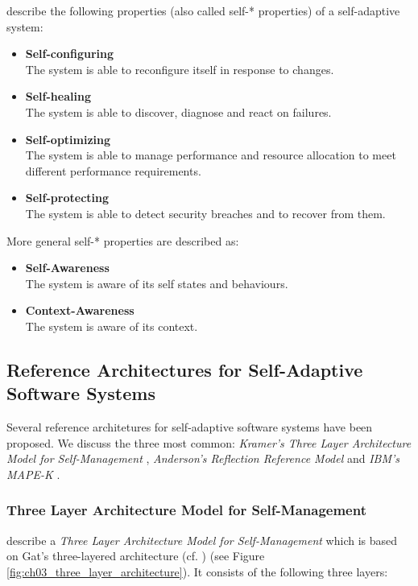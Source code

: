 \cite{Salehie:2009pi} describe the following properties (also called self-* properties) of a self-adaptive system:
\begin{itemize}
	\item \textbf{Self-configuring}\\
	The system is able to reconfigure itself in response to changes.
	\item \textbf{Self-healing}\\
	The system is able to discover, diagnose and react on failures.
	\item \textbf{Self-optimizing}\\
	The system is able to manage performance and resource allocation to meet different performance requirements.
	\item \textbf{Self-protecting}\\
	The system is able to detect security breaches and to recover from them.
\end{itemize}

More general self-* properties are described as:
\begin{itemize}
	\item \textbf{Self-Awareness}\\
	The system is aware of its self states and behaviours.
	\item \textbf{Context-Awareness}\\
	The system is aware of its context.
\end{itemize}

\subsection{Reference Architectures for Self-Adaptive Software Systems}
Several reference architetures for self-adaptive software systems have been proposed. We discuss the three most common: \emph{Kramer's Three Layer Architecture Model for Self-Management} \citep{Kramer:2007ff}, \emph{Anderson's Reflection Reference Model} \citep{Andersson:2009bq} and \emph{IBM's MAPE-K} \citep{Group:2005ug}.

\subsubsection{Three Layer Architecture Model for Self-Management}
\cite{Kramer:2007ff} describe a \emph{Three Layer Architecture Model for Self-Management} which is based on Gat's three-layered architecture (cf. \cite{Gat:1998:TA:292092.292130}) (see Figure \ref{fig:ch03_three_layer_architecture}). It consists of the following three layers:

